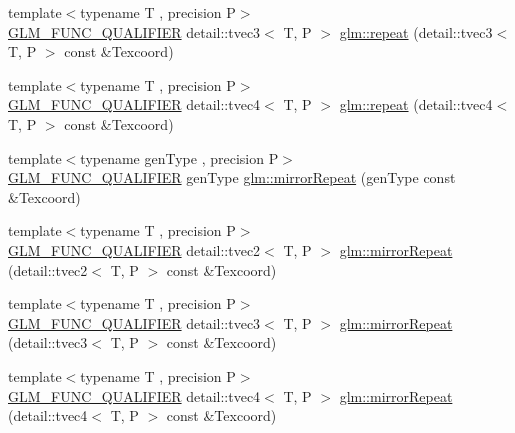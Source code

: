 \begin{DoxyCompactItemize}
\item 
{\footnotesize template$<$typename T , precision P$>$ }\\\hyperlink{setup_8hpp_a33fdea6f91c5f834105f7415e2a64407}{G\+L\+M\+\_\+\+F\+U\+N\+C\+\_\+\+Q\+U\+A\+L\+I\+F\+I\+ER} detail\+::tvec3$<$ T, P $>$ \hyperlink{namespaceglm_a93da051ea2cdf0d5d13e1637657e0796}{glm\+::repeat} (detail\+::tvec3$<$ T, P $>$ const \&Texcoord)
\item 
{\footnotesize template$<$typename T , precision P$>$ }\\\hyperlink{setup_8hpp_a33fdea6f91c5f834105f7415e2a64407}{G\+L\+M\+\_\+\+F\+U\+N\+C\+\_\+\+Q\+U\+A\+L\+I\+F\+I\+ER} detail\+::tvec4$<$ T, P $>$ \hyperlink{namespaceglm_a1af9904d6f7e983e9138d5ffd0fa0949}{glm\+::repeat} (detail\+::tvec4$<$ T, P $>$ const \&Texcoord)
\item 
{\footnotesize template$<$typename gen\+Type , precision P$>$ }\\\hyperlink{setup_8hpp_a33fdea6f91c5f834105f7415e2a64407}{G\+L\+M\+\_\+\+F\+U\+N\+C\+\_\+\+Q\+U\+A\+L\+I\+F\+I\+ER} gen\+Type \hyperlink{group__gtx__wrap_ga16a89b0661b60d5bea85137bbae74d73}{glm\+::mirror\+Repeat} (gen\+Type const \&Texcoord)
\item 
{\footnotesize template$<$typename T , precision P$>$ }\\\hyperlink{setup_8hpp_a33fdea6f91c5f834105f7415e2a64407}{G\+L\+M\+\_\+\+F\+U\+N\+C\+\_\+\+Q\+U\+A\+L\+I\+F\+I\+ER} detail\+::tvec2$<$ T, P $>$ \hyperlink{namespaceglm_a49e9d8b92c2dd5f6e6a3069b3262c1bb}{glm\+::mirror\+Repeat} (detail\+::tvec2$<$ T, P $>$ const \&Texcoord)
\item 
{\footnotesize template$<$typename T , precision P$>$ }\\\hyperlink{setup_8hpp_a33fdea6f91c5f834105f7415e2a64407}{G\+L\+M\+\_\+\+F\+U\+N\+C\+\_\+\+Q\+U\+A\+L\+I\+F\+I\+ER} detail\+::tvec3$<$ T, P $>$ \hyperlink{namespaceglm_aa586893a109d75e6f0421841832548aa}{glm\+::mirror\+Repeat} (detail\+::tvec3$<$ T, P $>$ const \&Texcoord)
\item 
{\footnotesize template$<$typename T , precision P$>$ }\\\hyperlink{setup_8hpp_a33fdea6f91c5f834105f7415e2a64407}{G\+L\+M\+\_\+\+F\+U\+N\+C\+\_\+\+Q\+U\+A\+L\+I\+F\+I\+ER} detail\+::tvec4$<$ T, P $>$ \hyperlink{namespaceglm_afcb197155bb9ff8d767cd57b540836b1}{glm\+::mirror\+Repeat} (detail\+::tvec4$<$ T, P $>$ const \&Texcoord)
\end{DoxyCompactItemize}
